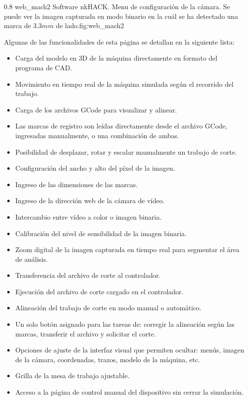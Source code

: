 \subfiga
{0.8} {web_mach2} {Software nkHACK. Menu de configuración de la cámara. Se puede ver la imagen capturada en modo binario en la cuál se ha detectado una marca de $3.3mm$ de lado.}{fig:web_mach2}

Algunas de las funcionalidades de esta página se detallan en la siguiente lista:
\begin{itemize}
   \item{Carga del modelo en 3D de la máquina directamente en formato del programa de CAD.}
   \item{Movimiento en tiempo real de la máquina simulada según el recorrido del trabajo.}
   \item{Carga de los archivos GCode para visualizar y alinear.}
   \item{Las marcas de registro son leídas directamente desde el archivo GCode, ingresadas manualmente, o una combinación de ambas.}
   \item{Posibilidad de desplazar, rotar y escalar manualmente un trabajo de corte.}
   \item{Configuración del ancho y alto del píxel de la imagen.}
   \item{Ingreso de las dimensiones de las marcas.}
   \item{Ingreso de la dirección web de la cámara de vídeo.}
   \item{Intercambio entre vídeo a color o imagen binaria.}
   \item{Calibración del nivel de sensibilidad de la imagen binaria.}
   \item{Zoom digital de la imagen capturada en tiempo real para segmentar el área de análisis.}
   \item{Transferencia del archivo de corte al controlador.}
   \item{Ejecución del archivo de corte cargado en el controlador.}
   \item{Alineación del trabajo de corte en modo manual o automático.}
   \item{Un solo botón asignado para las tareas de: corregir la alineación según las marcas, transferir el archivo y solicitar el corte.}
   \item{Opciones de ajuste de la interfaz visual que permiten ocultar: menús, imagen de la cámara, coordenadas, trazos, modelo de la máquina, etc.}
   \item{Grilla de la mesa de trabajo ajustable.}
   \item{Acceso a la página de control manual del dispositivo sin cerrar la simulación.}
\end{itemize}


